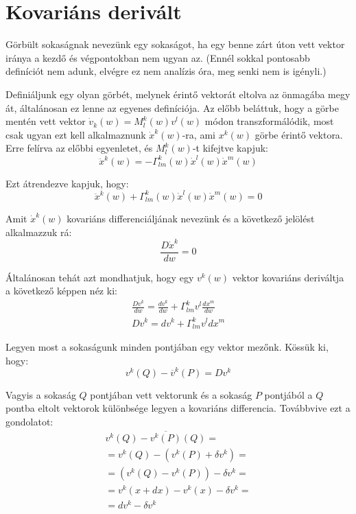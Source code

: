 \documentclass[a4paper,12pt]{article}
\begin{document}
\section{ Kovariáns derivált}
\par Görbült sokaságnak nevezünk egy sokaságot, ha egy benne zárt úton vett vektor iránya a kezdő és végpontokban nem ugyan az. (Ennél sokkal pontosabb definíciót nem adunk, elvégre ez nem analízis óra, meg senki nem is igényli.) 
\par Definiáljunk egy olyan görbét, melynek érintő vektorát eltolva az önmagába megy át, általánosan ez lenne az egyenes definíciója. Az előbb beláttuk, hogy a görbe mentén vett vektor $\dot{v}_{k}(w) = M^{k}_{l}(w)v^{l}(w)$ módon transzformálódik, most csak ugyan ezt kell alkalmaznunk $\dot{x}^{k}(w)$-ra, ami $x^{k}(w)$ görbe érintő vektora. Erre felírva az előbbi egyenletet, és $M^{k}_{l}(w)$-t kifejtve kapjuk:
\begin{equation*}
    \ddot{x}^{k}(w) = - \Gamma_{lm}^{k}(w)\dot{x}^{l}(w)\dot{x}^{m}(w)
\end{equation*}
\par Ezt átrendezve kapjuk, hogy:
\begin{equation*}
    \ddot{x}^{k}(w) + \Gamma_{lm}^{k}(w)\dot{x}^{l}(w)\dot{x}^{m}(w) = 0
\end{equation*}
\par Amit $\dot{x}^{k}(w)$ kovariáns differenciáljának nevezünk és a következő jelölést alkalmazzuk rá:
\begin{equation*}
    \frac{D \dot{x}^{k}}{dw} = 0
\end{equation*}
\par Általánosan tehát azt mondhatjuk, hogy egy $v^{k}(w)$ vektor kovariáns deriváltja a következő képpen néz ki:
\begin{gather*}
    \frac{Dv^{k}}{dw} = \frac{dv^{k}}{dw} + \Gamma_{lm}^{k}v^{l}\frac{dx^{m}}{dw} \\
    Dv^{k} = dv^{k} + \Gamma_{lm}^{k}v^{l}dx^{m}
\end{gather*}
\par Legyen most a sokaságunk minden pontjában egy vektor mezőnk. Kössük ki, hogy:
\begin{equation*}
    v^{k}(Q) - \overline{v}^{k}(P) = Dv^{k}
\end{equation*}
\par Vagyis a sokaság $Q$ pontjában vett vektorunk és a sokaság $P$ pontjából a $Q$ pontba eltolt vektorok különbsége legyen a kovariáns differencia. Továbbvive ezt a gondolatot:
\begin{align*}
    v^{k}(Q) - \overline{v^{k}(P)}(Q) = \\
    = v^{k}(Q) - (v^{k}(P) + \delta v^{k}) = \\
    = (v^{k}(Q) - v^{k}(P)) - \delta v^{k} = \\
    = v^{k}(x + dx) - v^{k}(x) - \delta v^{k} = \\
    = dv^{k} - \delta v^{k}
\end{align*}
\end{document}
